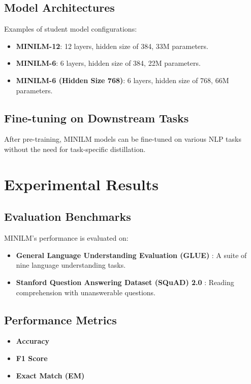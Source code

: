 \documentclass{article}
\begin{document}
\subsection{Model Architectures}  
  
Examples of student model configurations:  
  
\begin{itemize}  
    \item \textbf{MINILM-12}: 12 layers, hidden size of 384, 33M parameters.  
    \item \textbf{MINILM-6}: 6 layers, hidden size of 384, 22M parameters.  
    \item \textbf{MINILM-6 (Hidden Size 768)}: 6 layers, hidden size of 768, 66M parameters.  
\end{itemize}  
  
\subsection{Fine-tuning on Downstream Tasks}  
  
After pre-training, MINILM models can be fine-tuned on various NLP tasks without the need for task-specific distillation.  
  
\section{Experimental Results}  
  
\subsection{Evaluation Benchmarks}  
  
MINILM's performance is evaluated on:  
  
\begin{itemize}  
    \item \textbf{General Language Understanding Evaluation (GLUE)} \cite{wang2018glue}: A suite of nine language understanding tasks.  
    \item \textbf{Stanford Question Answering Dataset (SQuAD) 2.0} \cite{rajpurkar2018know}: Reading comprehension with unanswerable questions.  
\end{itemize}  
  
\subsection{Performance Metrics}  
  
\begin{itemize}  
    \item \textbf{Accuracy}  
    \item \textbf{F1 Score}  
    \item \textbf{Exact Match (EM)}  
\end{itemize}  
  
\end{document}
